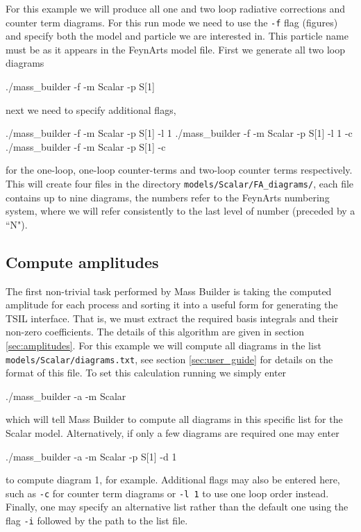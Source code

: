 For this example we will produce all one and two loop radiative corrections and counter term diagrams.  For this run mode we need to use the \lstinline{-f} flag (figures) and specify both the model and particle we are interested in.  This particle name must be as it appears in the FeynArts model file.  First we generate all two loop diagrams
\begin{lstterm}
./mass_builder -f -m Scalar -p S[1]
\end{lstterm}
next we need to specify additional flags,
\begin{lstterm}
./mass_builder -f -m Scalar -p S[1] -l 1
./mass_builder -f -m Scalar -p S[1] -l 1 -c
./mass_builder -f -m Scalar -p S[1]  -c
\end{lstterm}
for the one-loop, one-loop counter-terms and two-loop counter terms respectively.  This will create four files in the directory \lstinline{models/Scalar/FA_diagrams/}, each file contains up to nine diagrams, the numbers refer to the FeynArts numbering system, where we will refer consistently to the last level of number (preceded by a ``N").

\subsection{Compute amplitudes}

The first non-trivial task performed by Mass Builder is taking the computed amplitude for each process and sorting it into a useful form for generating the TSIL interface.  That is, we must extract the required basis integrals and their non-zero coefficients.  The details of this algorithm are given in section \ref{sec:amplitudes}.  For this example we will compute all diagrams in the list \lstinline{models/Scalar/diagrams.txt}, see section \ref{sec:user_guide} for details on the format of this file.  To set this calculation running we simply enter
\begin{lstterm}
./mass_builder -a -m Scalar
\end{lstterm}
which will tell Mass Builder to compute all diagrams in this specific list for the Scalar model.  Alternatively, if only a few diagrams are required one may enter
\begin{lstterm}
./mass_builder -a -m Scalar -p S[1] -d 1
\end{lstterm}
to compute diagram 1, for example.  Additional flags may also be entered here, such as \lstinline{-c} for counter term diagrams or \lstinline{-l 1} to use one loop order instead.  Finally, one may specify an alternative list rather than the default one using the flag \lstinline{-i} followed by the path to the list file.


